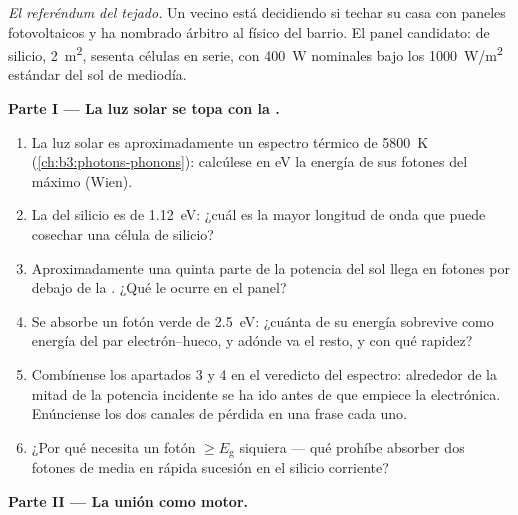 \begin{problem}\label{pb:b3:electrons-in-solids:1}
\emph{El referéndum del tejado.} Un vecino está decidiendo si
techar su casa con paneles fotovoltaicos y ha nombrado árbitro
al físico del barrio. El panel candidato: de silicio,
\qty{2}{m^2}, sesenta células en serie, con \qty{400}{W} nominales bajo
los \qty{1000}{W/m^2} estándar del sol de mediodía.

\medskip\noindent\textbf{Parte I --- La luz solar se topa con la .}

\begin{enumerate}
  \item La luz solar es aproximadamente un espectro térmico de \qty{5800}{K}
        (\cref{ch:b3:photons-phonons}): calcúlese en eV la energía de sus
        fotones del máximo (Wien).
  \item La  del silicio es de \qty{1.12}{eV}: ¿cuál es la mayor
        longitud de onda que puede cosechar una célula de silicio?
  \item Aproximadamente una quinta parte de la potencia del sol llega en fotones
        por debajo de la . ¿Qué le ocurre en el panel?
  \item Se absorbe un fotón verde de \qty{2.5}{eV}: ¿cuánta de su
        energía sobrevive como energía del par electrón--hueco, y adónde
        va el resto, y con qué rapidez?
  \item Combínense los apartados 3 y 4 en el veredicto del espectro: alrededor de
        la mitad de la potencia incidente se ha ido antes de que empiece la electrónica.
        Enúnciense los dos canales de pérdida en una frase cada uno.
  \item ¿Por qué necesita un fotón $\ge E_{\text{g}}$ siquiera --- qué
        prohíbe absorber dos fotones de media  en rápida
        sucesión en el silicio corriente?
\end{enumerate}

\medskip\noindent\textbf{Parte II --- La unión como motor.}


\end{problem}
